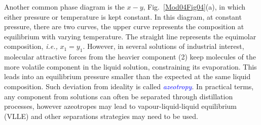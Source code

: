 \documentclass[12pts,a4paper,amsmath,amssymb,floatfix]{article}%
\newcommand{\blue}{\textcolor{blue}}
\newcommand{\ie}{{\it i.e., }}
\begin{document}
     Another common phase diagram is the $x-y$, Fig.~\ref{Mod04Fig04}(a), in which either pressure or temperature is kept constant. In this diagram, at constant pressure, there are two curves, the upper curve represents the composition at equilibrium with varying temperature. The straight line represents the equimolar composition, \ie $x_{1}=y_{1}$. However, in several solutions of industrial interest, molecular attractive forces from the heavier component (2) keep molecules of the more volatile component in the liquid solution, constraining its evaporation. This leads into an equilibrium pressure smaller than the expected at the same liquid composition. Such deviation from ideality is called \blue{\it azeotropy}. In practical terms, any component from solutions can often be separated through distillation processes, however azeotropes may lead to vapour-liquid-liquid equilibrium (VLLE) and other separations strategies may need to be used.  
     
\end{document}
